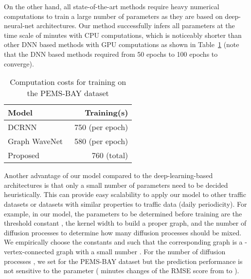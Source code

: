 \documentclass[journal]{IEEEtran}
\begin{document}
On the other hand, all state-of-the-art methods require heavy numerical computations to train a large number of parameters as they are based on deep-neural-net architectures.
Our method successfully infers all parameters at the time scale of minutes with CPU computations, which is noticeably shorter than other DNN based methods with GPU computations as shown in Table~\ref{table:computation} (note that the DNN based methods required from 50 epochs to 100 epochs to converge).

\begin{table}[t!]
\caption{Computation costs for training on the PEMS-BAY dataset}
\label{table:computation}
\centering
\begin{tabular}{lr}
\toprule
Model &    Training(s)\\
\midrule
DCRNN~\cite{li2018diffusion}        &  750 (per epoch)\\
Graph WaveNet~\cite{xu2018graph} &  580 (per epoch)\\
Proposed       &  760 (total)\\
\bottomrule
\end{tabular}
\end{table}



Another advantage of our model compared to the deep-learning-based architectures is that only a small number of parameters need to be decided heuristically. This can provide easy scalability to apply our model to other traffic datasets or datasets with similar properties to traffic data (daily periodicity).
For example, in our model, the parameters to be determined before training are the threshold constant , the kernel width  to build a proper graph, and the number of diffusion processes  to determine how many diffusion processes should be mixed. 
We empirically choose the constants  and  such that the corresponding graph  is a -vertex-connected graph with a small number .
For the number of diffusion processes , we set  for the PEMS-BAY dataset but the prediction performance is not sensitive to the parameter ( minutes changes of the RMSE score from  to ).
\end{document}
